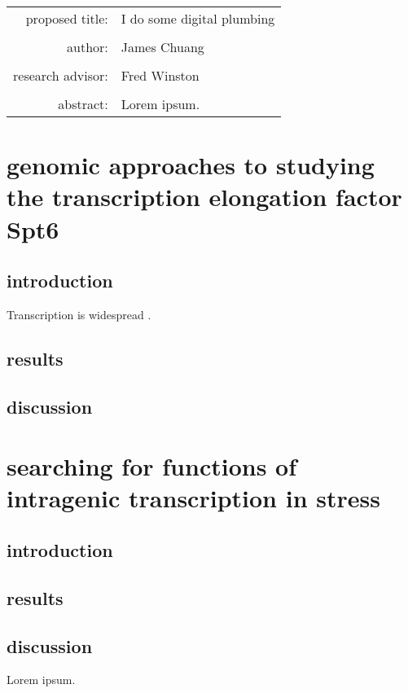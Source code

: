 \documentclass[11pt, a4paper]{article}
\begin{document}
\begin{titlepage}
\begin{tabular}{ r l }
 proposed title:   & I do some digital plumbing \\
 		   & \\
 author:	   & James Chuang \\
 		   & \\
 research advisor: & Fred Winston \\
 		   & \\
 abstract:	   & Lorem ipsum.
\end{tabular}
\end{titlepage}

\section{genomic approaches to studying the transcription elongation factor Spt6}

\subsection{introduction}

Transcription is widespread \cite{jensen2013, pelechano2017}.

\subsection{results}
\subsection{discussion}

\section{searching for functions of intragenic transcription in stress}
\subsection{introduction}
\subsection{results}
\subsection{discussion}

Lorem ipsum.

\printbibliography
\end{document}
